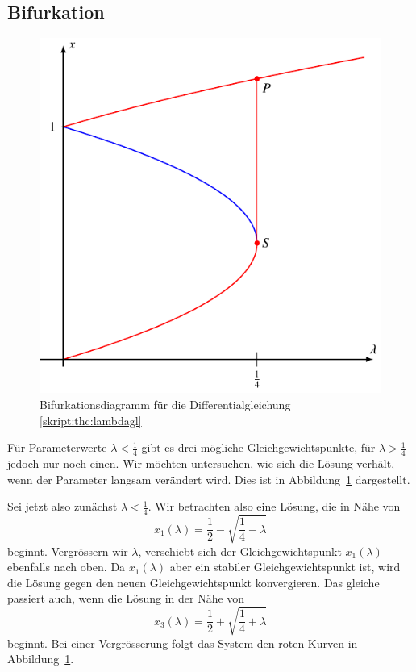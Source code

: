 \subsection{Bifurkation}
\begin{figure}
\centering
\includegraphics{chapters/4/bi.pdf}
\caption{Bifurkationsdiagramm für die Differentialgleichung
\eqref{skript:thc:lambdagl}
\label{skript:thc:bifurkation}}
\end{figure}
Für Parameterwerte $\lambda < \frac14$ gibt es drei mögliche
Gleichgewichtspunkte, für $\lambda>\frac14$ jedoch nur noch einen.
Wir möchten untersuchen, wie sich die Lösung verhält, wenn der
Parameter langsam verändert wird.
Dies ist in Abbildung~\ref{skript:thc:bifurkation} dargestellt.

Sei jetzt also zunächst $\lambda <\frac14$.
Wir betrachten also eine Lösung, die in Nähe von
\[
x_1(\lambda)=\frac12-\sqrt{\frac14-\lambda}
\]
beginnt.
Vergrössern wir $\lambda$, verschiebt sich der Gleichgewichtspunkt
$x_1(\lambda)$ ebenfalls nach oben.
Da $x_1(\lambda)$ aber ein stabiler Gleichgewichtspunkt ist, wird die
Lösung gegen den neuen Gleichgewichtspunkt konvergieren.
Das gleiche passiert auch, wenn die Lösung in der Nähe von
\[
x_3(\lambda)=\frac12+\sqrt{\frac14+\lambda}
\]
beginnt.
Bei einer Vergrösserung folgt das System den roten Kurven in
Abbildung~\ref{skript:thc:bifurkation}.

